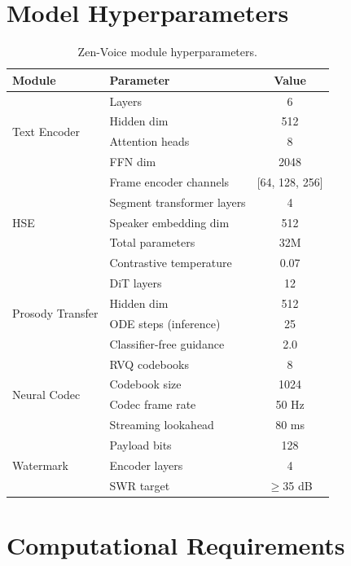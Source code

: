 \documentclass[11pt,a4paper]{article}
\begin{document}
\appendix

\section{Model Hyperparameters}
\label{app:hyperparams}

\begin{table}[h]
\centering
\caption{Zen-Voice module hyperparameters.}
\label{tab:hyperparams}
\begin{tabular}{llc}
\toprule
\textbf{Module} & \textbf{Parameter} & \textbf{Value} \\
\midrule
\multirow{4}{*}{Text Encoder} & Layers & 6 \\
& Hidden dim & 512 \\
& Attention heads & 8 \\
& FFN dim & 2048 \\
\midrule
\multirow{5}{*}{HSE} & Frame encoder channels & [64, 128, 256] \\
& Segment transformer layers & 4 \\
& Speaker embedding dim & 512 \\
& Total parameters & 32M \\
& Contrastive temperature & 0.07 \\
\midrule
\multirow{4}{*}{Prosody Transfer} & DiT layers & 12 \\
& Hidden dim & 512 \\
& ODE steps (inference) & 25 \\
& Classifier-free guidance & 2.0 \\
\midrule
\multirow{4}{*}{Neural Codec} & RVQ codebooks & 8 \\
& Codebook size & 1024 \\
& Codec frame rate & 50 Hz \\
& Streaming lookahead & 80 ms \\
\midrule
\multirow{3}{*}{Watermark} & Payload bits & 128 \\
& Encoder layers & 4 \\
& SWR target & $\geq$35 dB \\
\bottomrule
\end{tabular}
\end{table}

\section{Computational Requirements}
\label{app:compute}
\end{document}
